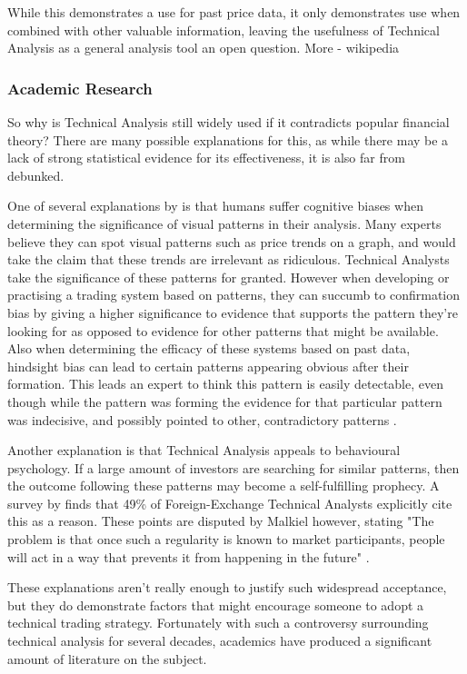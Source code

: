 \documentclass{article}
\begin{document}
While this demonstrates a use for past price data, it only demonstrates use when combined with other valuable information, leaving the usefulness of Technical Analysis as a general analysis tool an open question. More - wikipedia

\subsubsection{Academic Research}

So why is Technical Analysis still widely used if it contradicts popular financial theory? There are many possible explanations for this, as while there may be a lack of strong statistical evidence for its effectiveness, it is also far from debunked. 	

One of several explanations by \cite[p.45-71]{aronson2011evidence} is that humans suffer cognitive biases when determining the significance of visual patterns in their analysis. Many experts believe they can spot visual patterns such as price trends on a graph, and would take the claim that these trends are irrelevant as ridiculous. Technical Analysts take the significance of these patterns for granted. However when developing or practising a trading system based on patterns, they can succumb to confirmation bias by giving a higher significance to evidence that supports the pattern they're looking for as opposed to evidence for other patterns that might be available. Also when determining the efficacy of these systems based on past data, hindsight bias can lead to certain patterns appearing obvious after their formation. This leads an expert to think this pattern is easily detectable, even though while the pattern was forming the evidence for that particular pattern was indecisive, and possibly pointed to other, contradictory patterns \cite[p.62]{aronson2011evidence}.

Another explanation is that Technical Analysis appeals to behavioural psychology. If a large amount of investors are searching for similar patterns, then the outcome following these patterns may become a self-fulfilling prophecy. A survey by \cite{examininguse1997} finds that 49\% of Foreign-Exchange Technical Analysts explicitly cite this as a reason. These points are disputed by Malkiel however, stating "The problem is that once such a regularity is known to market participants, people will act in a way that prevents it from happening in the future" \cite[p.162]{randomwalk2012}.

These explanations aren't really enough to justify such widespread acceptance, but they do demonstrate factors that might encourage someone to adopt a technical trading strategy. Fortunately with such a controversy surrounding technical analysis for several decades, academics have produced a significant amount of literature on the subject.
\end{document}
